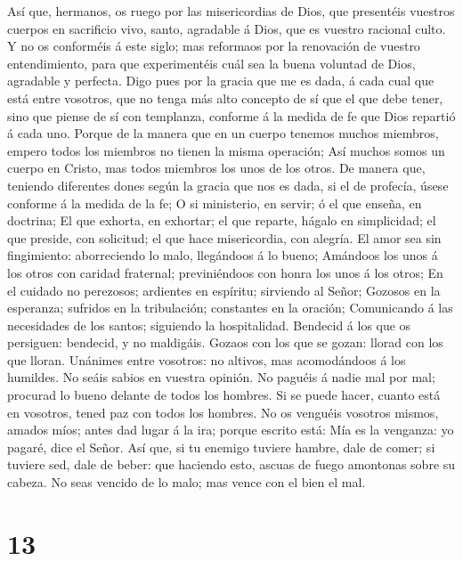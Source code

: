  Así que, hermanos, os ruego por las misericordias de Dios,
que presentéis vuestros cuerpos en sacrificio vivo, santo, agradable á
Dios, que es vuestro racional culto.  Y no os conforméis á
este siglo; mas reformaos por la renovación de vuestro entendimiento,
para que experimentéis cuál sea la buena voluntad de Dios, agradable y
perfecta.  Digo pues por la gracia que me es dada, á cada
cual que está entre vosotros, que no tenga más alto concepto de sí que
el que debe tener, sino que piense de sí con templanza, conforme á la
medida de fe que Dios repartió á cada uno.  Porque de la
manera que en un cuerpo tenemos muchos miembros, empero todos los
miembros no tienen la misma operación;  Así muchos somos un
cuerpo en Cristo, mas todos miembros los unos de los otros. 
De manera que, teniendo diferentes dones según la gracia que nos es
dada, si el de profecía, úsese conforme á la medida de la fe;
 O si ministerio, en servir; ó el que enseña, en doctrina;
 El que exhorta, en exhortar; el que reparte, hágalo en
simplicidad; el que preside, con solicitud; el que hace misericordia,
con alegría.  El amor sea sin fingimiento: aborreciendo lo
malo, llegándoos á lo bueno;  Amándoos los unos á los otros
con caridad fraternal; previniéndoos con honra los unos á los otros;
 En el cuidado no perezosos; ardientes en espíritu;
sirviendo al Señor;  Gozosos en la esperanza; sufridos en
la tribulación; constantes en la oración;  Comunicando á
las necesidades de los santos; siguiendo la hospitalidad. 
Bendecid á los que os persiguen: bendecid, y no maldigáis. 
Gozaos con los que se gozan: llorad con los que lloran. 
Unánimes entre vosotros: no altivos, mas acomodándoos á los humildes. No
seáis sabios en vuestra opinión.  No paguéis á nadie mal
por mal; procurad lo bueno delante de todos los hombres. 
Si se puede hacer, cuanto está en vosotros, tened paz con todos los
hombres.  No os venguéis vosotros mismos, amados míos;
antes dad lugar á la ira; porque escrito está: Mía es la venganza: yo
pagaré, dice el Señor.  Así que, si tu enemigo tuviere
hambre, dale de comer; si tuviere sed, dale de beber: que haciendo esto,
ascuas de fuego amontonas sobre su cabeza.  No seas vencido
de lo malo; mas vence con el bien el mal.

\hypertarget{section-12}{%
\section{13}\label{section-12}}

